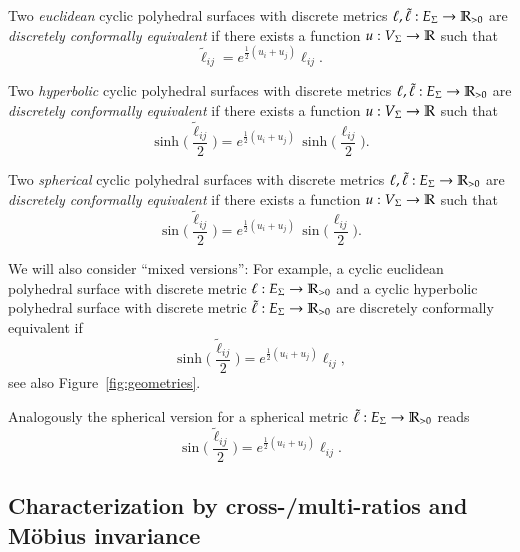 \documentclass[Thesis]{subfiles}
\begin{document}
Two \emph{euclidean} cyclic polyhedral surfaces with discrete metrics $\ell,\tilde\ell:E_{\Sigma}\rightarrow\mathbb R_{>0}$ are \emph{discretely conformally equivalent} if there exists a function $u:V_{\Sigma}\rightarrow\mathbb R$ such that
\begin{equation}
\label{eq:tilde_ell_euc}
\tilde\ell_\mathit{ij}=e^{\frac{1}{2}(u_{i}+u_{j})}\ell_\mathit{ij}.
\end{equation}

Two \emph{hyperbolic} cyclic polyhedral surfaces with discrete metrics $\ell,\tilde\ell:E_{\Sigma}\rightarrow\mathbb R_{>0}$ are \emph{discretely conformally equivalent} if there exists a function $u:V_{\Sigma}\rightarrow\mathbb R$ such that
\begin{equation}
\label{eq:tilde_ell_hyp}
\sinh\Big(\frac{\tilde\ell_\mathit{ij}}{2}\Big)
= e^{\frac{1}{2}(u_{i}+u_{j})}\,
\sinh\Big(\frac{\ell_\mathit{ij}}{2}\Big).
\end{equation}


Two \emph{spherical} cyclic polyhedral surfaces with discrete metrics $\ell,\tilde\ell:E_{\Sigma}\rightarrow\mathbb R_{>0}$ are \emph{discretely conformally equivalent} if there exists a function $u:V_{\Sigma}\rightarrow\mathbb R$ such that
\begin{equation}
\label{eq:tilde_ell_sph}
\sin\Big(\frac{\tilde\ell_\mathit{ij}}{2}\Big)
= e^{\frac{1}{2}(u_{i}+u_{j})}\,
\sin\Big(\frac{\ell_\mathit{ij}}{2}\Big).
\end{equation}

We will also consider ``mixed versions'': For example, a cyclic euclidean polyhedral surface with discrete metric $\ell:E_{\Sigma}\rightarrow\mathbb R_{>0}$ and a cyclic hyperbolic polyhedral surface with discrete metric $\tilde\ell:E_{\Sigma}\rightarrow\mathbb R_{>0}$ are discretely conformally equivalent if
\begin{equation*}
\sinh\Big(\frac{\tilde\ell_\mathit{ij}}{2}\Big)
= e^{\frac{1}{2}(u_{i}+u_{j})}\ell_\mathit{ij},
\end{equation*}
see also Figure~\ref{fig:geometries}. 

Analogously the spherical version for a spherical metric $\tilde\ell:E_{\Sigma}\rightarrow\mathbb R_{>0}$ reads
\begin{equation*}
\sin\Big(\frac{\tilde\ell_\mathit{ij}}{2}\Big)
= e^{\frac{1}{2}(u_{i}+u_{j})}\ell_\mathit{ij}.
\end{equation*}

\subsection{Characterization by cross-/multi-ratios and M{\"o}bius invariance}
\label{sec:cross-ratios}
\end{document}
